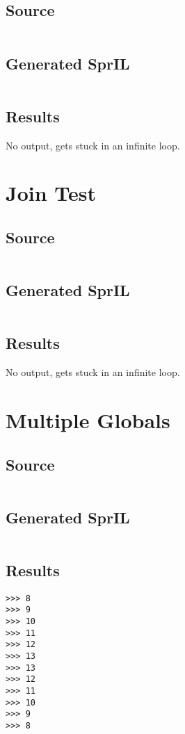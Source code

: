 \documentclass[twoside]{report}
\begin{document}
\subsection{Source}
\inputminted[tabsize=4,linenos,firstnumber=1]{text}{../test/infinite_loop.shl}
\subsection{Generated SprIL}
\inputminted[tabsize=4,linenos,firstnumber=0]{text}{../test/infinite_loop_gen.txt}
\subsection{Results}
No output, gets stuck in an infinite loop.

\section{Join Test}
\subsection{Source}
\inputminted[tabsize=4,linenos,firstnumber=1]{text}{../test/join_test.shl}
\subsection{Generated SprIL}
\inputminted[tabsize=4,linenos,firstnumber=0]{text}{../test/join_test_gen.txt}
\subsection{Results}
No output, gets stuck in an infinite loop.

\section{Multiple Globals}
\subsection{Source}
\inputminted[tabsize=4,linenos,firstnumber=1]{text}{../test/multiple_globals.shl}
\subsection{Generated SprIL}
\inputminted[tabsize=4,linenos,firstnumber=0]{text}{../test/multiple_globals_gen.txt}
\subsection{Results}
\begin{verbatim}
>>> 8
>>> 9
>>> 10
>>> 11
>>> 12
>>> 13
>>> 13
>>> 12
>>> 11
>>> 10
>>> 9
>>> 8
\end{verbatim}
\end{document}
